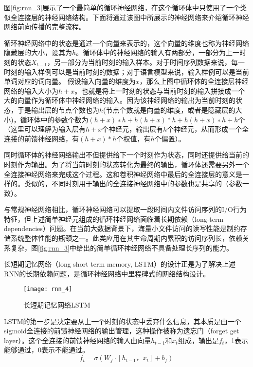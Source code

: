 图\ref{fig:rnn_3}展示了一个最简单的循环神经网络，在这个循环体中只使用了一个类似全连接层的神经网络结构。下面将通过该图中所展示的神经网络来介绍循环神经网络前向传播的完整流程。

循环神经网络中的状态是通过一个向量来表示的，这个向量的维度也称为神经网络隐藏层的大小，设其为$h$。循环体中的神经网络的输入有两部分，一部分为上一时刻的状态$X_{t-1}$，另一部分为当前时刻的输入样本。对于时间序列数据来说，每一时刻的输入样例可以是当前时刻的数据；对于语言模型来说，输入样例可以是当前单词对应的词向量。
假设输入向量的维度为$x$，那么上图中循环体的全连接层神经网络的输入大小为$h+x$。也就是将上一时刻的状态与当前时刻的输入拼接成一个大的向量作为循环体中神经网络的输入。因为该神经网络的输出为当前时刻的状态，于是输出层的节点个数也为$h$(节点个数就是向量的维度，或者是隐藏层的大小)，循环体中的参数个数为$(h+x)∗h+h(h+x)*h+h(h+x)∗h+h$个（这里可以理解为输入层有$h+x$个神经元，输出层有$h$个神经元，从而形成一个全连接的前馈神经网络，有$(h+x)*h$个权值，有$h$个偏置）。

同时循环体的神经网络输出不但提供给下一个时刻作为状态，同时还提供给当前的时刻作为输出。为了将当前时刻的状态转化为最终的输出，循环体还需要另外一个全连接神经网络来完成这个过程。这和卷积神经网络中最后的全连接层的意义是一样的。类似的，不同时刻用于输出的全连接神经网络中的参数也是共享的（参数一致）。

与常规神经网络相比，循环神经网络可以提取一段时间内文件访问序列的I/O行为特征，但上述简单神经元组成的循环神经网络面临着长期依赖（long-term dependencies）问题。在当前大数据背景下，海量小文件访问的读写性能是制约存储系统整体性能的瓶颈之一。此类应用在其生命周期内累积的访问序列长，依赖关系复杂，图\ref{fig:rnn_3}中给出的简单循环神经网络不具备处理长序列的能力。

长短期记忆网络（long short term memory, LSTM）\cite{LSTM}的设计正是为了解决上述RNN的长期依赖问题，是循环神经网络中里程碑式的网络结构设计。

\begin{figure}[htp]
\centering
\texttt{[image: rnn\_4]}
\caption{长短期记忆网络LSTM}
\label{fig:rnn_4}
\end{figure}

LSTM的第一步是决定要从上一个时刻的状态中丢弃什么信息，其本质是由一个sigmoid全连接的前馈神经网络的输出管理，这种操作被称为遗忘门（forget get layer）。这个全连接的前馈神经网络的输入由向量$h_{t-1}$​和$x_t$组成，输出是$f_t$，1表示能够通过，0表示不能通过。
\begin{equation}
    f_t = \sigma(W_f \cdot [h_{t-1}，x_t]+b_f)
\end{equation}

